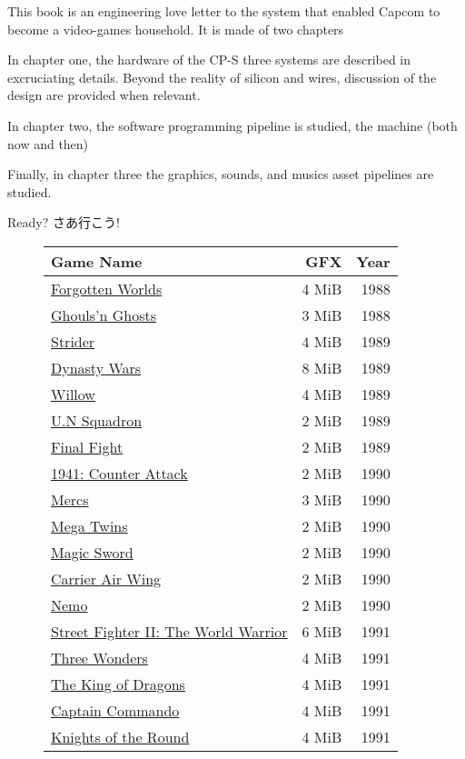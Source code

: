 This book is an engineering love letter to the system that enabled Capcom to become a video-games household. It is made of two chapters

In chapter one, the hardware of the CP-S three systems are described in excruciating details. Beyond the reality of silicon and wires, discussion of the design are provided when relevant.

In chapter two, the software programming pipeline is studied, the machine (both now and then)

Finally, in chapter three the graphics, sounds, and musics asset pipelines are studied.


\begin{CJK}{UTF8}{min}
Ready? さあ行こう!
\end{CJK}

\begin{figure}[H]
{ \setlength{\tabcolsep}{3.0pt}
\begin{tabularx}{\textwidth}{Xrr} 
  \textbf{Game Name} & \textbf{ GFX }  & \textbf{ Year } \\               
  \toprule    
\href{}{Forgotten Worlds} & 4 MiB & 1988 \\ 
\href{}{Ghouls'n Ghosts} & 3 MiB & 1988 \\ 
  \toprule    
\href{}{Strider} & 4 MiB & 1989 \\ 
\href{}{Dynasty Wars} & 8 MiB & 1989 \\ 
\href{}{Willow} & 4 MiB & 1989 \\ 
\href{}{U.N Squadron} & 2 MiB & 1989 \\ 
\href{}{Final Fight} & 2 MiB & 1989 \\ 
  \toprule    
\href{}{1941: Counter Attack} & 2 MiB &  1990 \\ 
\href{}{Mercs} &  3 MiB & 1990 \\ 
\href{}{Mega Twins} & 2 MiB & 1990 \\ 
\href{}{Magic Sword} & 2 MiB & 1990 \\ 
\href{}{Carrier Air Wing} & 2 MiB  & 1990 \\ 
\href{}{Nemo} & 2 MiB &  1990 \\ 
  \toprule    
\href{}{Street Fighter II: The World Warrior} & 6 MiB & 1991 \\ 
\href{}{Three Wonders} & 4 MiB & 1991 \\ 
\href{}{The King of Dragons} & 4 MiB & 1991 \\ 
\href{}{Captain Commando} &  4 MiB & 1991 \\ 
\href{}{Knights of the Round} & 4 MiB  & 1991 \\ 

\end{tabularx}}
\end{figure}
